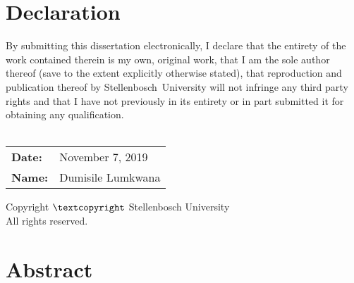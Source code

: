 \TitlePage

\chapter{Declaration}
By submitting this dissertation electronically, I declare that the entirety of the work contained therein is my own, original work, that I am the sole author thereof (save to the extent explicitly otherwise stated), that reproduction and publication thereof by \mbox{Stellenbosch University} will not infringe any third party rights and that I have not \mbox{previously} in its entirety or in part submitted it for obtaining any qualification. \\ \\

\noindent
\begin{tabular}{@{}ll}
\textbf{Date:} & November 7, 2019 \\ 
\textbf{Name:} & Dumisile Lumkwana \\ 
\end{tabular}

\vspace*{\fill}
\begin{center}
Copyright $\textcopyright$ Stellenbosch University \\
All rights reserved.
\end{center}

\chapter{Abstract}

